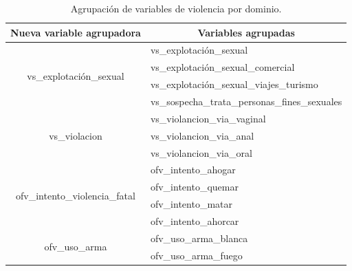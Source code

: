 \documentclass[10 pt]{article}
\begin{document}
\begin{table}[H]
    \centering
    \caption{Agrupación de variables de violencia por dominio.}
    \label{tablaagrup}
    \begin{tabular}{|c|l|}
    \hline
    \multicolumn{1}{|l|}{\textbf{Nueva variable agrupadora}} & \multicolumn{1}{c|}{\textbf{Variables agrupadas}} \\ \hline
    \multirow{4}{*}{vs\_explotación\_sexual}                 & vs\_explotación\_sexual                           \\ \cline{2-2} 
                                                             & vs\_explotación\_sexual\_comercial                \\ \cline{2-2} 
                                                             & vs\_explotación\_sexual\_viajes\_turismo          \\ \cline{2-2} 
                                                             & vs\_sospecha\_trata\_personas\_fines\_sexuales    \\ \hline
    \multirow{3}{*}{vs\_violacion}                          & vs\_violancion\_via\_vaginal                      \\ \cline{2-2} 
                                                             & vs\_violancion\_via\_anal                         \\ \cline{2-2} 
                                                             & vs\_violancion\_via\_oral                         \\ \hline
    \multirow{4}{*}{ofv\_intento\_violencia\_fatal}          & ofv\_intento\_ahogar                              \\ \cline{2-2} 
                                                             & ofv\_intento\_quemar                              \\ \cline{2-2} 
                                                             & ofv\_intento\_matar                               \\ \cline{2-2} 
                                                             & ofv\_intento\_ahorcar                             \\ \hline
    \multirow{2}{*}{ofv\_uso\_arma}                          & ofv\_uso\_arma\_blanca                            \\ \cline{2-2} 
                                                             & ofv\_uso\_arma\_fuego                             \\ \hline
    \end{tabular}
    \end{table}
\end{document}
